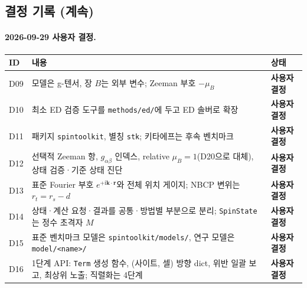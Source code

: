 \subsection{결정 기록 (계속)}\label{decisions-continued}
\begingroup%
  \framesubtitle{2026-09-29 사용자 결정.}
  \small\renewcommand{\arraystretch}{1.12}
  \begin{tabularx}{\textwidth}{@{}p{0.7cm}YP{2.5cm}@{}}
    \toprule
    ID & 내용 & 상태 \\
    \midrule
    D09 & 모델은 g-텐서, 장 $B$는 외부 변수; Zeeman 부호 $-\mu_B$ & \textbf{사용자 결정} \\
    D10 & 최소 ED 검증 도구를 \texttt{methods/ed/}에 두고 ED 솔버로 확장 & \textbf{사용자 결정} \\
    D11 & 패키지 \texttt{spintoolkit}, 별칭 \texttt{stk}; 키타에프는 후속 벤치마크 & \textbf{사용자 결정} \\
    D12 & 선택적 Zeeman 항, $g_{\alpha\beta}$ 인덱스, relative $\mu_B=1$(D20으로 대체), 상태 검증·기준 상태 진단 & \textbf{사용자 결정} \\
    D13 & 표준 Fourier 부호 $e^{+\mathrm i\mathbf k\cdot\mathbf r}$와 전체 위치 게이지; NBCP 변위는 $r_t=r_s-d$ & \textbf{사용자 결정} \\
    D14 & 상태·계산 요청·결과를 공통·방법별 부분으로 분리; \texttt{SpinState}는 정수 초격자 $M$ & \textbf{사용자 결정} \\
    D15 & 표준 벤치마크 모델은 \texttt{spintoolkit/models/}, 연구 모델은 \texttt{model/<name>/} & \textbf{사용자 결정} \\
    D16 & 1단계 API: \texttt{Term} 생성 함수, (사이트, 셀) 방향 dict, 위반 일괄 보고, 최상위 노출; 직렬화는 4단계 & \textbf{사용자 결정} \\
    \bottomrule
  \end{tabularx}
  \par\smallskip
\endgroup


